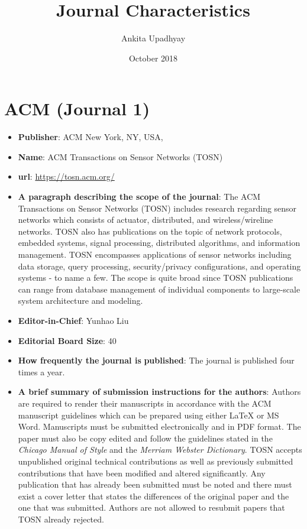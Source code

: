 \documentclass[11pt,twocolumn]{article}
\title{Journal Characteristics}
\author{Ankita Upadhyay }
\date{October 2018}
\begin{document}
\maketitle
\section{ACM (Journal 1)}
\begin{itemize}
  \item{\bf{Publisher}}: ACM New York, NY, USA, 
  \item {\bf{Name}}: ACM Transactions on Sensor Networks (TOSN)
  \item{\bf{url}}: \url{https://tosn.acm.org/}
  \item {\bf{A paragraph describing the scope of the journal}}: The ACM Transactions on Sensor Networks (TOSN) includes research regarding sensor networks which consists of actuator, distributed, and wireless/wireline networks. TOSN also has publications on the topic of network protocols, embedded systems, signal processing, distributed algorithms, and information management. TOSN encompasses applications of sensor networks including data storage, query processing, security/privacy configurations, and operating systems - to name a few. The scope is quite broad since TOSN publications can range from database management of individual components to large-scale system architecture and modeling.
  \item{\bf{Editor-in-Chief}}: Yunhao Liu
  \item{\bf{Editorial Board Size}}: 40
  \item{\bf{How frequently the  journal is}}
  {\bf{published}}: The journal is published four times a year.
  \item{\bf{A brief summary of submission instructions for the authors}}: Authors are required to render their manuscripts in accordance with the ACM manuscript guidelines which can be prepared using either LaTeX or MS Word. Manuscripts must be submitted electronically and in PDF format. The paper must also be copy edited and follow the guidelines stated in the {\textit{Chicago Manual of Style}} and the {\textit{Merriam Webster Dictionary}}. TOSN accepts unpublished original technical contributions as well as previously submitted contributions that have been modified and altered significantly. Any publication that has already been submitted must be noted and there must exist a cover letter that states the differences of the original paper and the one that was submitted. Authors are not allowed to resubmit papers that TOSN already rejected.

\end{itemize}
\end{document}
